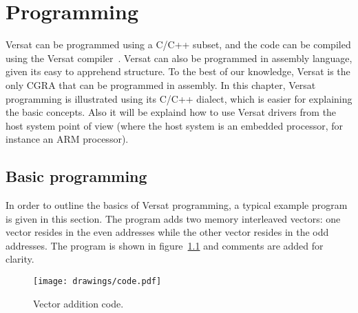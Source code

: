 
\chapter{Programming}
\label{chapter:programming}

Versat can be programmed using a C/C++ subset, and the code can be
compiled using the Versat compiler~\cite{Santiago2016}. Versat can
also be programmed in assembly language, given its easy to apprehend
structure. To the best of our knowledge, Versat is the only CGRA that
can be programmed in assembly. In this chapter, Versat programming is
illustrated using its C/C++ dialect, which is easier for explaining
the basic concepts. Also it will be explaind how to use Versat drivers
from the host system point of view (where the host system is an
embedded processor, for instance an ARM processor).


\section{Basic programming}
\label{section:basicProgramming}

In order to outline the basics of Versat programming, a typical
example program is given in this section. The program adds two memory
interleaved vectors: one vector resides in the even addresses while
the other vector resides in the odd addresses. The program is shown in
figure~\ref{fig_vec_add} and comments are added for clarity.

\begin{figure}[!htb]
\centering \texttt{[image: drawings/code.pdf]}
\caption{Vector addition code.}
\label{fig_vec_add}
\end{figure}

